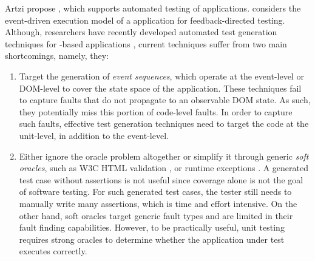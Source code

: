 Artzi \etal propose \artemis \cite{artzi:icse11}, which supports automated testing of \javascript applications.
\artemis considers the event-driven execution model of a \javascript application for feedback-directed testing. 
Although, researchers have recently developed automated test generation techniques for \javascript-based applications \cite{artzi:icse11, marchetto:search, tonella:icst08, mesbah:tse12, song:symb10}, current techniques suffer from two main shortcomings, namely, they:
\begin{enumerate} 
\item Target the generation of \emph{event sequences}, which operate at the event-level or DOM-level to cover the state space of the application. These techniques fail to capture faults that  do not propagate to an observable DOM state. As such, they potentially miss this portion of code-level \javascript faults. In order to capture such faults, effective test generation techniques need to target the code at the \javascript unit-level, in addition to the event-level.
\item Either ignore the oracle problem altogether or simplify it through generic \emph{soft oracles}, such as  W3C HTML  validation \cite{artzi:icse11,mesbah:tse12}, or  \javascript runtime exceptions \cite{artzi:icse11}.
A generated test case without assertions is not useful since coverage alone is not the goal of software testing. For such generated test cases, the tester still needs to  manually write many assertions, which is time and effort intensive. 
On the other hand, soft oracles  target generic fault types and are limited in their fault finding capabilities.   %
However, to be practically useful, unit testing requires strong oracles  to determine whether the application under test executes correctly.
\end{enumerate}

